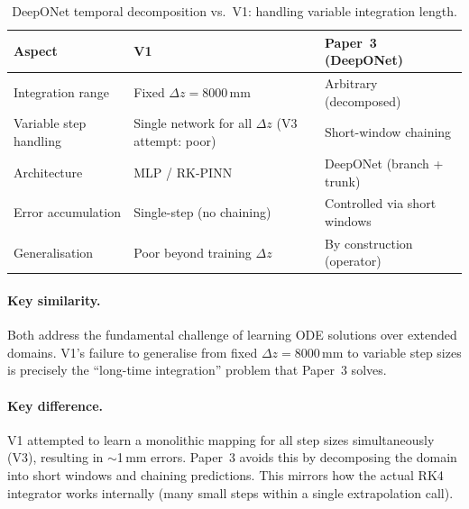 \documentclass[12pt,a4paper]{article}
\begin{document}
\begin{table}[h]
\centering
\caption{DeepONet temporal decomposition vs.\ V1: handling variable integration length.}
\label{tab:comp_deeponet}
\begin{tabular}{p{4cm}p{5cm}p{5cm}}
\toprule
\textbf{Aspect} & \textbf{V1} & \textbf{Paper~3 (DeepONet)} \\
\midrule
Integration range & Fixed $\Delta z = 8000$\,mm & Arbitrary (decomposed) \\
Variable step handling & Single network for all $\Delta z$ (V3 attempt: poor) & Short-window chaining \\
Architecture & MLP / RK-PINN & DeepONet (branch + trunk) \\
Error accumulation & Single-step (no chaining) & Controlled via short windows \\
Generalisation & Poor beyond training $\Delta z$ & By construction (operator) \\
\bottomrule
\end{tabular}
\end{table}

\paragraph{Key similarity.} Both address the fundamental challenge of learning ODE solutions over extended domains. V1's failure to generalise from fixed $\Delta z = 8000$\,mm to variable step sizes is precisely the ``long-time integration'' problem that Paper~3 solves.

\paragraph{Key difference.} V1 attempted to learn a monolithic mapping for all step sizes simultaneously (V3), resulting in ${\sim}$1\,mm errors. Paper~3 avoids this by decomposing the domain into short windows and chaining predictions. This mirrors how the actual RK4 integrator works internally (many small steps within a single extrapolation call).
\end{document}
